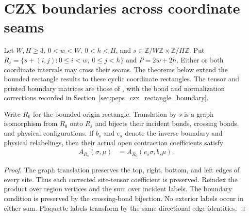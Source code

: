 \section{CZX boundaries across coordinate seams}%
\label{sec:czx_wrapping_rectangle}

Let $W,H\ge3$, $0<w<W$, $0<h<H$, and
$s\in\mathbb Z/W\mathbb Z\times\mathbb Z/H\mathbb Z$. Put
$R_s=\{s+(i,j):0\le i<w,\ 0\le j<h\}$ and $P=2w+2h$.
Either or both coordinate intervals may cross their seams. The theorems below
extend the bounded rectangle results to these cyclic coordinate rectangles.
The tensor and printed boundary matrices are those of
\cite[Appendix~A]{Cirac2021Matrix}, with the bond and normalization corrections
recorded in Section~\ref{sec:peps_czx_rectangle_boundary}.

\begin{lemma}%
    \label{lem:czx_wrapping_contraction}
    \leanok
    Write $R_0$ for the bounded origin rectangle. Translation by $s$ is a
    graph isomorphism from $R_0$ onto $R_s$ and bijects their incident bonds,
    crossing bonds, and physical configurations. If $b_s$ and $e_s$ denote
    the inverse boundary and physical relabelings, then their actual open
    contraction coefficients satisfy
    \begin{align}
        A_{R_s}(\sigma,\mu)&=A_{R_0}(e_s\sigma,b_s\mu).
        \label{eq:czx_wrapping_contraction}
    \end{align}
\end{lemma}
\begin{proof}\leanok
    The graph translation preserves the top, right, bottom, and left edges
    of every site. Thus each corrected site-tensor coefficient is preserved.
    Reindex the product over region vertices and the sum over incident labels.
    The boundary condition is preserved by the crossing-bond bijection.
    No exterior labels occur in either sum. Plaquette labels transform by
    the same directional-edge identities.
\end{proof}


